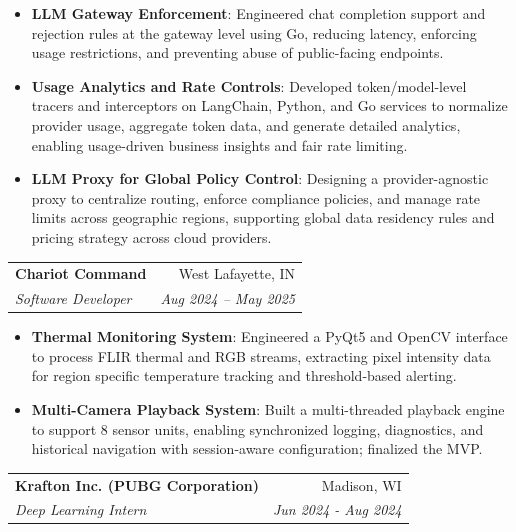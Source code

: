 \documentclass[letterpaper,11pt]{article}
\makeatletter
\newcommand{\resumeItem}[2]{
  \item\small{
    \textbf{#1}{: #2 \vspace{-2pt}}
  }
}
\newcommand{\resumeSubheading}[4]{
  \vspace{-1pt}\item
    \begin{tabular*}{0.97\textwidth}{l@{\extracolsep{\fill}}r}
      \textbf{#1} & #2 \\
      \textit{\small#3} & \textit{\small #4} \\
    \end{tabular*}\vspace{-5pt}
}
\newcommand{\resumeItemListStart}{\begin{itemize}}
\newcommand{\resumeItemListEnd}{\end{itemize}\vspace{-5pt}}
\makeatother
\begin{document}
\resumeItemListStart
  \resumeItem{LLM Gateway Enforcement}
  {Engineered chat completion support and rejection rules at the gateway level using Go, reducing latency, enforcing usage restrictions, and preventing abuse of public-facing endpoints.}

  \resumeItem{Usage Analytics and Rate Controls}
  {Developed token/model-level tracers and interceptors on LangChain, Python, and Go services to normalize provider usage, aggregate token data, and generate detailed analytics,  enabling usage-driven business insights and fair rate limiting.}
  
  \resumeItem{LLM Proxy for Global Policy Control}
  {Designing a provider-agnostic proxy to centralize routing, enforce compliance policies, and manage rate limits across geographic regions, supporting global data residency rules and pricing strategy across cloud providers.}
\resumeItemListEnd


\resumeSubheading
  {Chariot Command}{West Lafayette, IN}
  {Software Developer}{Aug 2024 -- May 2025}
\resumeItemListStart
  \resumeItem{Thermal Monitoring System}
    {Engineered a PyQt5 and OpenCV interface to process FLIR thermal and RGB streams, extracting pixel intensity data for region specific temperature tracking and threshold-based alerting.}
\resumeItem{Multi-Camera Playback System}
  {Built a multi-threaded playback engine to support 8 sensor units, enabling synchronized logging, diagnostics, and historical navigation with session-aware configuration; finalized the MVP.}

\resumeItemListEnd





  
    \resumeSubheading
      {Krafton Inc. (PUBG Corporation)}{Madison, WI}
      {Deep Learning Intern}{Jun 2024 - Aug 2024}

\end{document}
